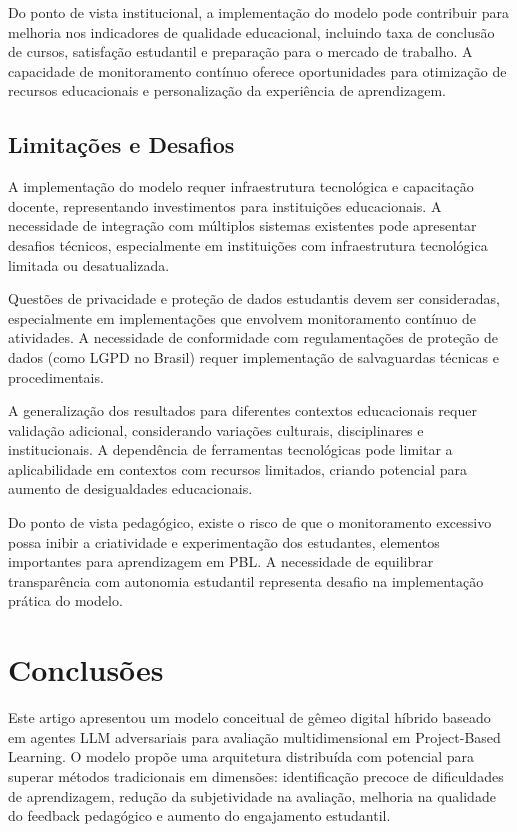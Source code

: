 \documentclass[english, spanish, brazilian]{modelo_dt}
\begin{document}
Do ponto de vista institucional, a implementação do modelo pode contribuir para melhoria nos indicadores de qualidade educacional, incluindo taxa de conclusão de cursos, satisfação estudantil e preparação para o mercado de trabalho\@. A capacidade de monitoramento contínuo oferece oportunidades para otimização de recursos educacionais e personalização da experiência de aprendizagem\@.

\subsection{Limitações e Desafios}

A implementação do modelo requer infraestrutura tecnológica e capacitação docente, representando investimentos para instituições educacionais\@. A necessidade de integração com múltiplos sistemas existentes pode apresentar desafios técnicos, especialmente em instituições com infraestrutura tecnológica limitada ou desatualizada\@.

Questões de privacidade e proteção de dados estudantis devem ser consideradas, especialmente em implementações que envolvem monitoramento contínuo de atividades\@. A necessidade de conformidade com regulamentações de proteção de dados (como LGPD no Brasil) requer implementação de salvaguardas técnicas e procedimentais\@.

A generalização dos resultados para diferentes contextos educacionais requer validação adicional, considerando variações culturais, disciplinares e institucionais\@. A dependência de ferramentas tecnológicas pode limitar a aplicabilidade em contextos com recursos limitados, criando potencial para aumento de desigualdades educacionais\@.

Do ponto de vista pedagógico, existe o risco de que o monitoramento excessivo possa inibir a criatividade e experimentação dos estudantes, elementos importantes para aprendizagem em PBL\@. A necessidade de equilibrar transparência com autonomia estudantil representa desafio na implementação prática do modelo\@.

\section{Conclusões}

Este artigo apresentou um modelo conceitual de gêmeo digital híbrido baseado em agentes LLM adversariais para avaliação multidimensional em Project-Based Learning\@. O modelo propõe uma arquitetura distribuída com potencial para superar métodos tradicionais em dimensões: identificação precoce de dificuldades de aprendizagem, redução da subjetividade na avaliação, melhoria na qualidade do feedback pedagógico e aumento do engajamento estudantil\@.
\end{document}
